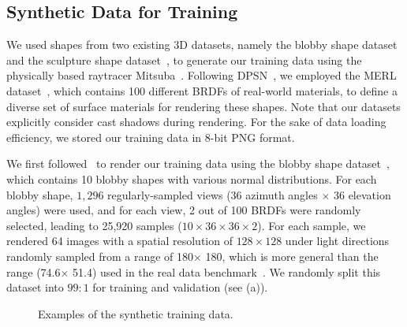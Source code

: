 \subsection{Synthetic Data for Training}
We used shapes from two existing 3D datasets, namely the blobby shape dataset~\cite{johnson2011shape} and the sculpture shape dataset~\cite{wiles2017silnet}, to generate our training data using the physically based raytracer Mitsuba~\cite{jakob2010mitsuba}. Following DPSN~\cite{santo2017deep}, we employed the MERL dataset~\cite{matusik2003merl}, which contains 100 different BRDFs of real-world materials, to define a diverse set of surface materials for rendering these shapes. 
Note that our datasets explicitly consider cast shadows during rendering.
For the sake of data loading efficiency, we stored our training data in 8-bit PNG format.

 We first followed~\cite{santo2017deep} to render our training data using the blobby shape dataset~\cite{johnson2011shape}, which contains 10 blobby shapes with various normal distributions. For each blobby shape, $1,296$ regularly-sampled views (36 azimuth angles $\times$ 36 elevation angles) were used, and for each view, 2 out of 100 BRDFs were randomly selected, leading to 25,920 samples ($10\times 36\times 36\times 2$).
For each sample, we rendered 64 images with a spatial resolution of $128 \times 128$ under light directions randomly sampled from a range of 180\degree $\times$ 180\degree, which is more general than the range (74.6\degree $\times$ 51.4\degree) used in the real data benchmark~\cite{shi2019benchmark}. We randomly split this dataset into $99:1$ for training and validation (see (a)).

\begin{figure} \centering
    
    \caption{Examples of the synthetic training data.}
    \label{fig:data_samples}
\end{figure}

